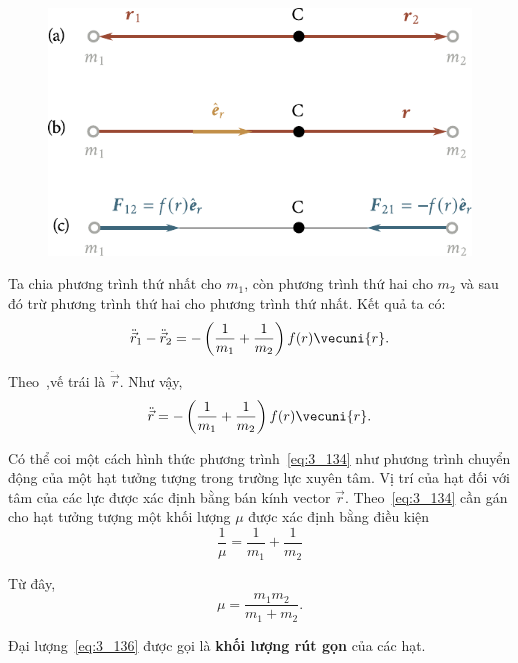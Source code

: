 \begin{figure}[!htb]
	\begin{center}
		\includegraphics[scale=1]{figures/ch_03/fig_3_30.pdf}
		\caption[]{}
		\label{fig:3_30}
	\end{center}
\end{figure}

\noindent
Ta chia phương trình thứ nhất cho $m_1$, còn phương trình thứ hai cho $m_2$ và sau đó trừ phương trình thứ hai cho phương trình thứ nhất. Kết quả ta có:
\begin{equation*}
\ddot{\vec{r}}_1 - \ddot{\vec{r}}_2 = -\left(\frac{1}{m_1}+\frac{1}{m_2}\right)f(r)\vecuni{r}.
\end{equation*}

\noindent
Theo~,vế trái là $\ddot{\vec{r}}$. Như vậy,
\begin{equation}\label{eq:3_134}
\ddot{\vec{r}} = -\left(\frac{1}{m_1}+\frac{1}{m_2}\right)f(r)\vecuni{r}.
\end{equation}

\noindent
Có thể coi một cách hình thức phương trình~\eqref{eq:3_134} như phương trình chuyển động của một hạt tưởng tượng trong trường lực xuyên tâm. Vị trí của hạt đối với tâm của các lực được xác định bằng bán kính vector $\vec{r}$. Theo~\eqref{eq:3_134} cần gán cho hạt tưởng tượng một khối lượng $\mu$ được xác định bằng điều kiện 
\begin{equation}\label{eq:3_135}
\frac{1}{\mu} = \frac{1}{m_1} + \frac{1}{m_2}
\end{equation}

\noindent
Từ đây,
\begin{equation}\label{eq:3_136}
\mu = \frac{m_1m_2}{m_1+m_2}.
\end{equation}

\noindent
Đại lượng~\eqref{eq:3_136} được gọi là \textbf{khối lượng rút gọn} của các hạt.

